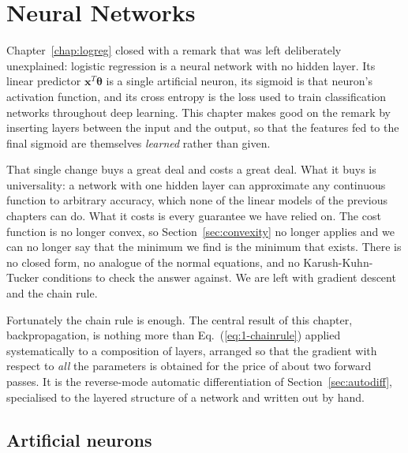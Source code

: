 \chapter{Neural Networks}
\label{chap:nn}

Chapter~\ref{chap:logreg} closed with a remark that was left deliberately
unexplained: logistic regression is a neural network with no hidden layer.  Its
linear predictor $\bm{x}^{T}\bm{\theta}$ is a single artificial neuron, its
sigmoid is that neuron's activation function, and its cross entropy is the loss
used to train classification networks throughout deep learning.  This chapter
makes good on the remark by inserting layers between the input and the output,
so that the features fed to the final sigmoid are themselves \emph{learned}
rather than given.

That single change buys a great deal and costs a great deal.  What it buys is
universality: a network with one hidden layer can approximate any continuous
function to arbitrary accuracy, which none of the linear models of the previous
chapters can do.  What it costs is every guarantee we have relied on.  The cost
function is no longer convex, so Section~\ref{sec:convexity} no longer applies
and we can no longer say that the minimum we find is the minimum that exists.
There is no closed form, no analogue of the normal equations, and no
Karush-Kuhn-Tucker conditions to check the answer against.  We are left with
gradient descent and the chain rule.

Fortunately the chain rule is enough.  The central result of this chapter,
backpropagation, is nothing more than Eq.~(\ref{eq:1-chainrule}) applied
systematically to a composition of layers, arranged so that the gradient with
respect to \emph{all} the parameters is obtained for the price of about two
forward passes.  It is the reverse-mode automatic differentiation of
Section~\ref{sec:autodiff}, specialised to the layered structure of a network
and written out by hand.


\section{Artificial neurons}
\label{sec:perceptron}

